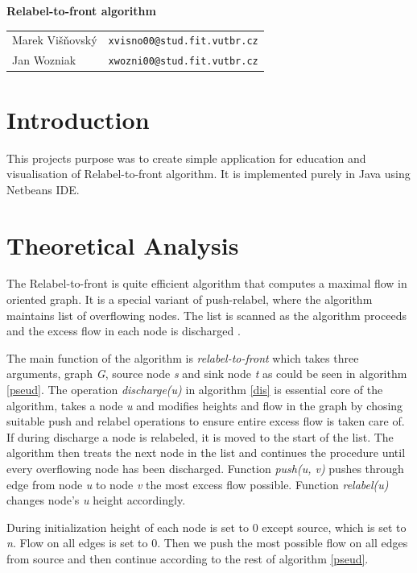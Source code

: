 \documentclass[a4paper,11pt]{article}
\begin{document}
\begin{center}{\LARGE\textbf{Relabel-to-front algorithm}}\\[0.2cm]
\newcommand{\autor}[2]{#1&\texttt{#2@stud.fit.vutbr.cz}\tabularnewline}
\begin{tabular}{ll}
    \autor{Marek Višňovský}{xvisno00}
    \autor{Jan Wozniak}{xwozni00}
\end{tabular}
\end{center}

\section{Introduction}
This projects purpose was to create simple application for education and visualisation
of Relabel-to-front algorithm. It is implemented purely in Java using Netbeans
IDE.

\section{Theoretical Analysis}
The Relabel-to-front is quite efficient algorithm that computes a maximal flow in
oriented graph\cite{wiki}. It is a special variant of push-relabel, where the algorithm maintains
list of overflowing nodes. The list is scanned as the algorithm proceeds and the
excess flow in each node is discharged \cite{diz}. 

The main function of the algorithm is \textit{relabel-to-front} which takes three
arguments, graph \textit{G}, source node \textit{s} and sink node \textit{t} as could
be seen in algorithm \ref{pseud}.
The operation \textit{discharge(u)} in algorithm \ref{dis} is essential core of the algorithm, 
takes a node \textit{u} and modifies heights and flow in the graph by chosing
suitable push and relabel operations to ensure entire excess flow is taken care of.
If during discharge a node is relabeled, it is moved to the start of the list.
The algorithm then treats the next node in the list and continues the procedure
until every overflowing node has been discharged.
Function \textit{push(u, v)} pushes through edge from node \textit{u} to node
\textit{v} the most excess flow possible. Function \textit{relabel(u)} changes
node's \textit{u} height accordingly.

During initialization height of each node is set to 0 except source, which is set
to \textit{n}. Flow on all edges is set to 0. Then we push the most possible flow
on all edges from source and then continue according to the rest of algorithm \ref{pseud}.
\end{document}
